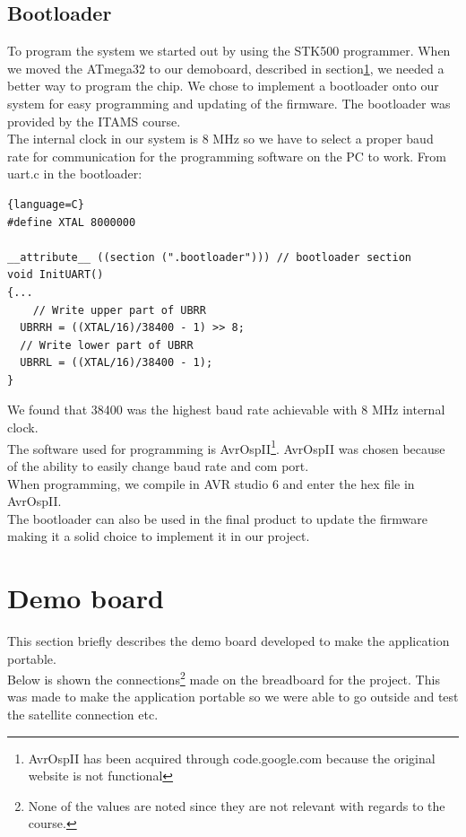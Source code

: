 \subsection{Bootloader}
To program the system we started out by using the STK500 programmer. When we moved the ATmega32 to our demoboard, described in section\ref{sec:demob}, we needed a better way to program the chip. We chose to implement a bootloader onto our system for easy programming and updating of the firmware. The bootloader was provided by the ITAMS course.\\
The internal clock in our system is 8 MHz so we have to select a proper baud rate for communication for the programming software on the PC to work. From uart.c in the bootloader:\\
\begin{lstlisting}{language=C}
#define XTAL 8000000  

__attribute__ ((section (".bootloader"))) // bootloader section
void InitUART()
{...
	// Write upper part of UBRR
  UBRRH = ((XTAL/16)/38400 - 1) >> 8;
  // Write lower part of UBRR
  UBRRL = ((XTAL/16)/38400 - 1);
}
\end{lstlisting}
We found that 38400 was the highest baud rate achievable with 8 MHz internal clock.\\
The software used for programming is AvrOspII\footnote{AvrOspII has been acquired through code.google.com because the original website is not functional}. AvrOspII was chosen because of the ability to easily change baud rate and com port.\\
When programming, we compile in AVR studio 6 and enter the hex file in AvrOspII.\\
The bootloader can also be used in the final product to update the firmware making it a solid choice to implement it in our project.\\

\section{Demo board}
\label{sec:demob}
This section briefly describes the demo board developed to make the application portable.\\
Below is shown the connections\footnote{None of the values are noted since they are not relevant with regards to the course.} made on the breadboard for the project. This was made to make the application portable so we were able to go outside and test the satellite connection etc.\\

